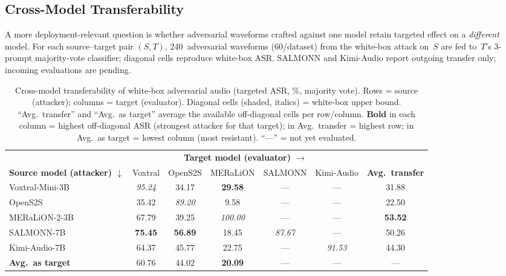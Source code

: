 \subsection{Cross-Model Transferability}
\label{sec:exp_transfer}

A more deployment-relevant question is whether adversarial waveforms crafted against one model retain targeted effect on a \emph{different} model.
For each source--target pair $(S,T)$, 240~adversarial waveforms (60/dataset) from the white-box attack on~$S$ are fed to~$T$'s 3-prompt majority-vote classifier; diagonal cells reproduce white-box ASR.
SALMONN and Kimi-Audio report outgoing transfer only; incoming evaluations are pending.

\begin{table}[!t]
\centering
\small
\caption{Cross-model transferability of white-box adversarial audio (targeted ASR, \%, majority vote).
Rows = source (attacker); columns = target (evaluator).
Diagonal cells (shaded, italics) = white-box upper bound.
``Avg.\ transfer'' and ``Avg.\ as target'' average the available off-diagonal cells per row/column.
\textbf{Bold} in each column = highest off-diagonal ASR (strongest attacker for that target); in Avg.\ transfer = highest row; in Avg.\ as target = lowest column (most resistant).
``---'' = not yet evaluated.}
\label{tab:cross_model_transfer}
\setlength{\tabcolsep}{6pt}
\begin{tabular}{l ccccc c}
\toprule
 & \multicolumn{5}{c}{\textbf{Target model (evaluator) $\rightarrow$}} & \\
\cmidrule(lr){2-6}
\textbf{Source model (attacker) $\downarrow$}
 & Voxtral & OpenS2S & MERaLiON & SALMONN & Kimi-Audio & \textbf{Avg.\ transfer} \\
\midrule
Voxtral-Mini-3B  & \cellcolor{gray!15}\textit{95.24} & 34.17 & \textbf{29.58} & --- & --- & 31.88 \\
OpenS2S          & 35.42 & \cellcolor{gray!15}\textit{89.20} & 9.58  & --- & --- & 22.50 \\
MERaLiON-2-3B    & 67.79 & 39.25 & \cellcolor{gray!15}\textit{100.00} & --- & --- & \textbf{53.52} \\
SALMONN-7B       & \textbf{75.45} & \textbf{56.89} & 18.45 & \cellcolor{gray!15}\textit{87.67} & --- & 50.26 \\
Kimi-Audio-7B    & 64.37 & 45.77 & 22.75 & --- & \cellcolor{gray!15}\textit{91.53} & 44.30 \\
\midrule
\textbf{Avg.\ as target} & 60.76 & 44.02 & \textbf{20.09} & --- & --- & --- \\
\bottomrule
\end{tabular}
\end{table}

